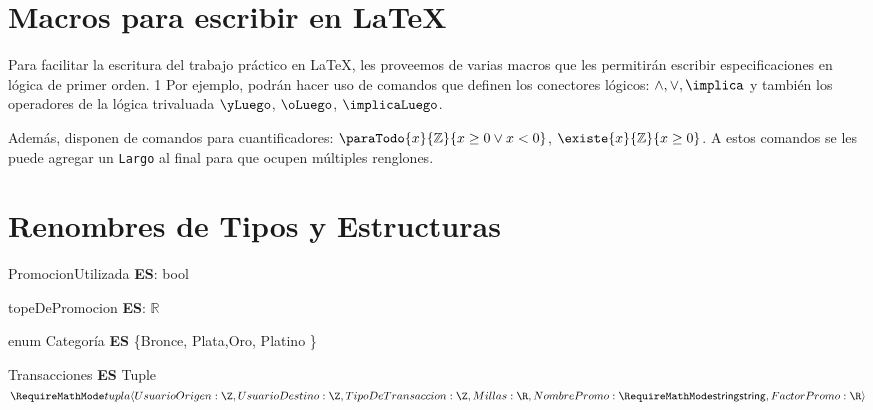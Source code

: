 \documentclass[11pt,a4paper]{article}
\newcommand{\Tipo}[1]{\mathsf{#1}}
\begin{document}
\maketitle

\section{Macros para escribir en LaTeX}

Para facilitar la escritura del trabajo práctico en LaTeX, les proveemos de varias macros que les permitirán escribir especificaciones en lógica de primer orden. 1
Por ejemplo, podrán hacer uso de comandos que definen los conectores lógicos: $\land, \lor, \implica$ y también los operadores de la lógica trivaluada $\yLuego$, $\oLuego$, $\implicaLuego$.

Además, disponen de comandos para cuantificadores: $\paraTodo{x}{\mathbb{Z}}{x \geq 0 \lor x < 0}$, $\existe{x}{\mathbb{Z}}{x \geq 0}$. A estos comandos se les puede agregar un \texttt{Largo} al final para que ocupen múltiples renglones.

\section{Renombres de Tipos y Estructuras}

\noindent PromocionUtilizada \textbf{ES}: bool

\noindent topeDePromocion \textbf{ES}: $\mathbb{R}$

\noindent enum Categoría \textbf{ES} \{Bronce, Plata,Oro, Platino  \}

\vspace{0.5cm}

\noindent Transacciones \textbf{ES} Tuple $\tupla{
	UsuarioOrigen: \Tipo{\Z}, \\
	UsuarioDestino: \Tipo{\Z},
	TipoDeTransaccion: \Tipo{\Z},
	Millas: \Tipo{\R}, \\
	NombrePromo: \Tipo{\str},
	FactorPromo: \Tipo{\R}
	}$

\noindent {}
\end{document}

